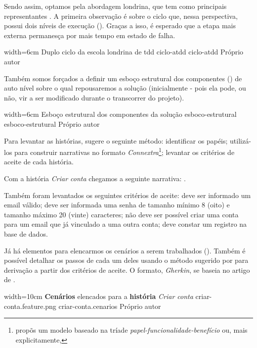   Sendo assim, optamos pela abordagem londrina, que tem como principais representantes . A primeira observação é sobre o ciclo que, nessa perspectiva, possui dois níveis de execução (). Graças a isso, é esperado que a etapa mais externa permanesça por mais tempo em estado de falha.

  \imagem
    {width=6cm}
    {Duplo ciclo da escola londrina de tdd}
    {ciclo-atdd}
    {ciclo-atdd}
    {Próprio autor\footnotemark}

  Também somos forçados a definir um esboço estrutural dos componentes () de auto nível sobre o qual repousaremos a solução (inicialmente - pois ela pode, ou não, vir a ser modificado durante o transcorrer do projeto).

  \imagem
    {width=6cm}
    {Esboço estrutural dos componentes da solução}
    {esboco-estrutural}
    {esboco-estrutural}
    {Próprio autor}

  Para levantar as histórias,  sugere o seguinte método: identificar os papéis; utilizá-los para construir narrativas no formato \emph{Connextra}\footnote{ propõs um modelo baseado na tríade \emph{papel-funcionalidade-benefício} ou, mais explicitamente, }; levantar os critérios de aceite de cada história.

  Com a história \emph{Criar conta} chegamos a seguinte narrativa: .

  Também foram levantados os seguintes critérios de aceite: deve ser informado um email válido; deve ser informada uma senha de tamanho mínimo 8 (oito) e tamanho máximo 20 (vinte) caracteres; não deve ser possível criar uma conta para um email que já vinculado a uma outra conta; deve constar um registro na base de dados.

  Já há elementos para elencarmos os cenários a serem trabalhados (). Também é possível detalhar os passos de cada um deles usando o método sugerido por  para derivação a partir dos critérios de aceite. O formato, \emph{Gherkin}, se baseia no artigo de .

  \imagem
    {width=10cm}
    {\textbf{Cenários} elencados para a \textbf{história} \emph{Criar conta}}
    {criar-conta.feature.png}
    {criar-conta.cenarios}
    {Próprio autor}

